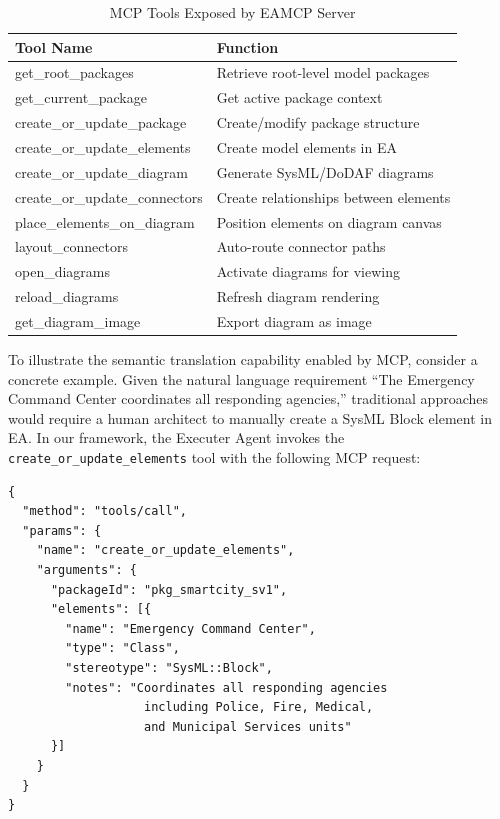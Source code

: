 \documentclass{ieeeaccess}
\begin{document}
\begin{table}[h]
\centering
\caption{MCP Tools Exposed by EAMCP Server}
\label{tab:mcp_tools}
\begin{tabular}{p{3.5cm}p{4.5cm}}
\toprule
\textbf{Tool Name} & \textbf{Function} \\
\midrule
get\_root\_packages & Retrieve root-level model packages \\
get\_current\_package & Get active package context \\
create\_or\_update\_package & Create/modify package structure \\
create\_or\_update\_elements & Create model elements in EA \\
create\_or\_update\_diagram & Generate SysML/DoDAF diagrams \\
create\_or\_update\_connectors & Create relationships between elements \\
place\_elements\_on\_diagram & Position elements on diagram canvas \\
layout\_connectors & Auto-route connector paths \\
open\_diagrams & Activate diagrams for viewing \\
reload\_diagrams & Refresh diagram rendering \\
get\_diagram\_image & Export diagram as image \\
\bottomrule
\end{tabular}
\end{table}

To illustrate the semantic translation capability enabled by MCP, consider a concrete example. Given the natural language requirement ``The Emergency Command Center coordinates all responding agencies,'' traditional approaches would require a human architect to manually create a SysML Block element in EA. In our framework, the Executer Agent invokes the \texttt{create\_or\_update\_elements} tool with the following MCP request:

{\footnotesize
\begin{verbatim}
{
  "method": "tools/call",
  "params": {
    "name": "create_or_update_elements",
    "arguments": {
      "packageId": "pkg_smartcity_sv1",
      "elements": [{
        "name": "Emergency Command Center",
        "type": "Class",
        "stereotype": "SysML::Block",
        "notes": "Coordinates all responding agencies
                   including Police, Fire, Medical,
                   and Municipal Services units"
      }]
    }
  }
}
\end{verbatim}}
\end{document}
